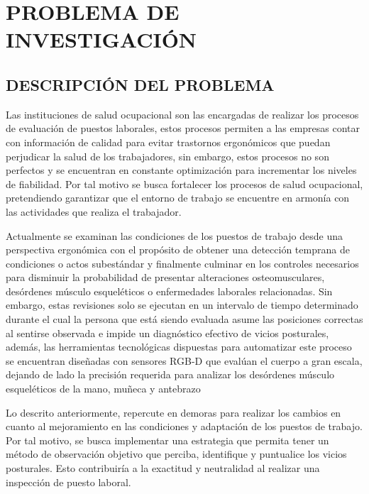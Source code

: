 \chapter{PROBLEMA DE INVESTIGACIÓN}

\section{DESCRIPCIÓN DEL PROBLEMA}
Las instituciones de salud ocupacional son las encargadas de realizar los procesos de evaluación de puestos laborales, estos procesos permiten a las empresas contar con información de calidad para evitar trastornos ergonómicos que puedan perjudicar la salud de los trabajadores, sin embargo, estos procesos no son perfectos y se encuentran en constante optimización para incrementar los niveles de fiabilidad. Por tal motivo se busca fortalecer los procesos de salud ocupacional, pretendiendo garantizar que el entorno de trabajo se encuentre en armonía con las actividades que realiza el trabajador. %

Actualmente se examinan las condiciones de los puestos de trabajo desde una perspectiva ergonómica con el propósito de obtener una detección temprana de condiciones o actos subestándar y finalmente culminar en los controles necesarios para disminuir la probabilidad de presentar alteraciones osteomusculares, desórdenes músculo esqueléticos o enfermedades laborales relacionadas. Sin embargo, estas revisiones solo se ejecutan en un intervalo de tiempo determinado durante el cual la persona que está siendo evaluada asume las posiciones correctas al sentirse observada e impide un diagnóstico efectivo de vicios posturales, además, las herramientas tecnológicas dispuestas para automatizar este proceso se encuentran diseñadas con sensores RGB-D que evalúan el cuerpo a gran escala, dejando de lado la precisión requerida para analizar los desórdenes músculo esqueléticos de la mano, muñeca y antebrazo

Lo descrito anteriormente, repercute en demoras para realizar los cambios en cuanto al mejoramiento en las condiciones y adaptación de los puestos de trabajo. Por tal motivo, se busca implementar una estrategia que permita tener un método de observación objetivo que perciba, identifique y puntualice los vicios posturales. Esto contribuiría a la exactitud y neutralidad al realizar una inspección de puesto laboral.

